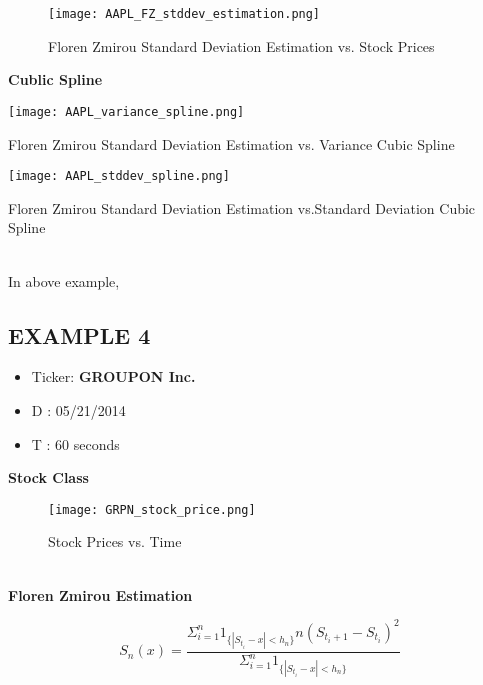 \begin{figure}[h]
\begin{center}
\texttt{[image: AAPL\_FZ\_stddev\_estimation.png]}
\end{center}
\caption{Floren Zmirou Standard Deviation Estimation vs. Stock Prices}
\label{fig:Stock Price}
\end{figure}
\newpage
\textbf{Cublic Spline}
\begin{center}
\texttt{[image: AAPL\_variance\_spline.png]}
\end{center}
\caption{Floren Zmirou Standard Deviation Estimation vs. Variance Cubic Spline}
\label{fig:Cubic Spline}
\begin{center}
\texttt{[image: AAPL\_stddev\_spline.png]}
\end{center}
\caption{Floren Zmirou Standard Deviation Estimation vs.Standard Deviation Cubic Spline}
\label{fig:Cubic Spline}
\\
In above example,  
\subsection{EXAMPLE 4}
\begin{itemize}
  \item Ticker: \textbf{GROUPON Inc.}
  \item  D : 05/21/2014
  \item  T : 60 seconds
\end{itemize}
\textbf{Stock Class}
\begin{figure}[h]
\begin{center}
\texttt{[image: GRPN\_stock\_price.png]}
\end{center}
\caption{Stock Prices vs. Time}
\label{fig:Stock Price}
\end{figure}
\\
\textbf{Floren Zmirou Estimation}\\
\begin{center}
\begin{equation}\label{florenZmirouEquation}
S_n(x) = \frac{\Sigma_{i=1}^{n} 1_{\{|S_{t_i}-x|<h_n\}} n (S_{t_i+1}-S_{t_i})^2}{\Sigma_{i=1}^{n} 1_{\{|S_{t_i}-x|<h_n\}}}
\end{equation}
\end{center}

